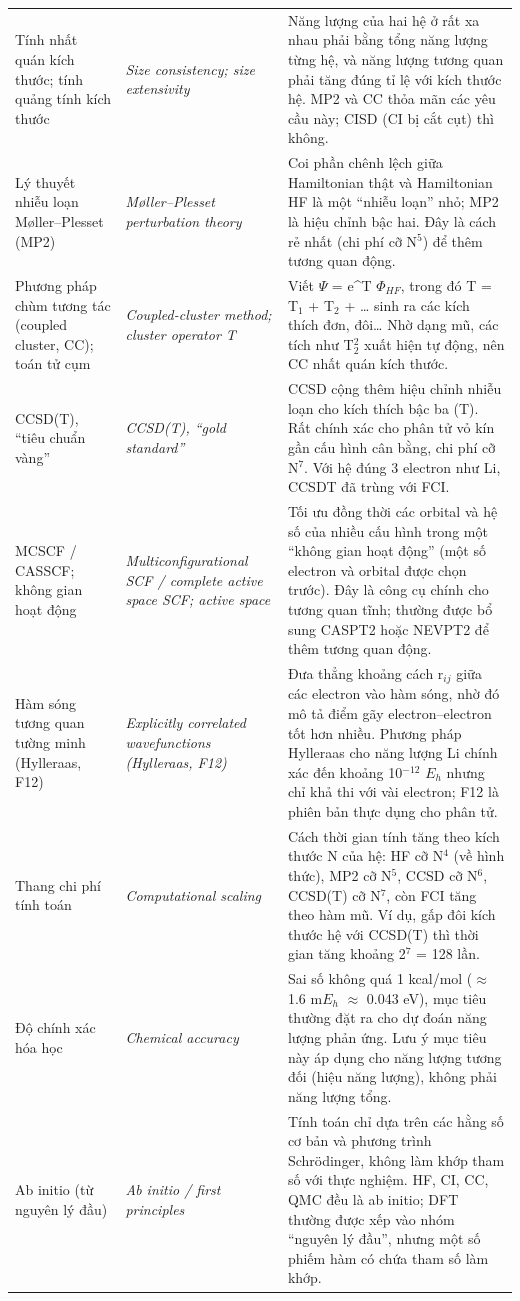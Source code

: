 \begin{longtable}{@{}>{\raggedright\arraybackslash}p{}>{\raggedright\arraybackslash\itshape}p{}>{\raggedright\arraybackslash}p{}@{}}
Tính nhất quán kích thước; tính quảng tính kích thước & Size consistency; size extensivity & Năng lượng của hai hệ ở rất xa nhau phải bằng tổng năng lượng từng hệ, và năng lượng tương quan phải tăng đúng tỉ lệ với kích thước hệ. MP2 và CC thỏa mãn các yêu cầu này; CISD (CI bị cắt cụt) thì không. \\[2pt]
Lý thuyết nhiễu loạn Møller–Plesset (MP2) & Møller–Plesset perturbation theory & Coi phần chênh lệch giữa Hamiltonian thật và Hamiltonian HF là một ``nhiễu loạn'' nhỏ; MP2 là hiệu chỉnh bậc hai. Đây là cách rẻ nhất (chi phí cỡ N$^{5}$) để thêm tương quan động. \\[2pt]
Phương pháp chùm tương tác (coupled cluster, CC); toán tử cụm & Coupled-cluster method; cluster operator T & Viết $\Psi$ = e\textasciicircum{}T $\Phi_{HF}$, trong đó T = T$_{1}$ + T$_{2}$ + … sinh ra các kích thích đơn, đôi… Nhờ dạng mũ, các tích như T$_{2}^{2}$ xuất hiện tự động, nên CC nhất quán kích thước. \\[2pt]
CCSD(T), ``tiêu chuẩn vàng'' & CCSD(T), ``gold standard'' & CCSD cộng thêm hiệu chỉnh nhiễu loạn cho kích thích bậc ba (T). Rất chính xác cho phân tử vỏ kín gần cấu hình cân bằng, chi phí cỡ N$^{7}$. Với hệ đúng 3 electron như Li, CCSDT đã trùng với FCI. \\[2pt]
MCSCF / CASSCF; không gian hoạt động & Multiconfigurational SCF / complete active space SCF; active space & Tối ưu đồng thời các orbital và hệ số của nhiều cấu hình trong một ``không gian hoạt động'' (một số electron và orbital được chọn trước). Đây là công cụ chính cho tương quan tĩnh; thường được bổ sung CASPT2 hoặc NEVPT2 để thêm tương quan động. \\[2pt]
Hàm sóng tương quan tường minh (Hylleraas, F12) & Explicitly correlated wavefunctions (Hylleraas, F12) & Đưa thẳng khoảng cách r$_{ij}$ giữa các electron vào hàm sóng, nhờ đó mô tả điểm gãy electron–electron tốt hơn nhiều. Phương pháp Hylleraas cho năng lượng Li chính xác đến khoảng 10$^{-12}$ $E_h$ nhưng chỉ khả thi với vài electron; F12 là phiên bản thực dụng cho phân tử. \\[2pt]
Thang chi phí tính toán & Computational scaling & Cách thời gian tính tăng theo kích thước N của hệ: HF cỡ N$^{4}$ (về hình thức), MP2 cỡ N$^{5}$, CCSD cỡ N$^{6}$, CCSD(T) cỡ N$^{7}$, còn FCI tăng theo hàm mũ. Ví dụ, gấp đôi kích thước hệ với CCSD(T) thì thời gian tăng khoảng 2$^{7}$ = 128 lần. \\[2pt]
Độ chính xác hóa học & Chemical accuracy & Sai số không quá 1 kcal/mol ($\approx$ 1.6 m$E_h$ $\approx$ 0.043 eV), mục tiêu thường đặt ra cho dự đoán năng lượng phản ứng. Lưu ý mục tiêu này áp dụng cho năng lượng tương đối (hiệu năng lượng), không phải năng lượng tổng. \\[2pt]
Ab initio (từ nguyên lý đầu) & Ab initio / first principles & Tính toán chỉ dựa trên các hằng số cơ bản và phương trình Schrödinger, không làm khớp tham số với thực nghiệm. HF, CI, CC, QMC đều là ab initio; DFT thường được xếp vào nhóm ``nguyên lý đầu'', nhưng một số phiếm hàm có chứa tham số làm khớp. \\[2pt]
\bottomrule\end{longtable}

